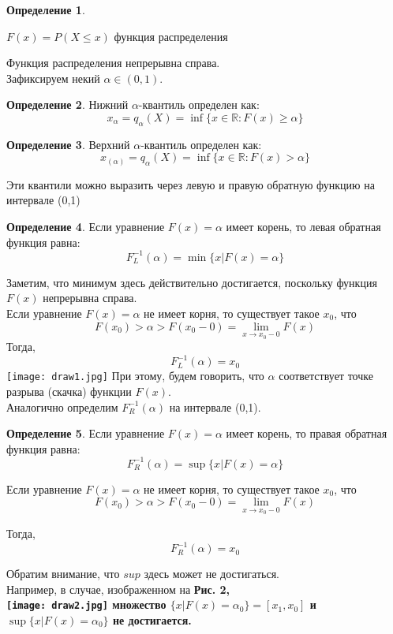 \documentclass[18pt,a4paper]{article}
\theoremstyle{plain}
\theoremstyle{definition}
\newtheorem{Def}{Определение}[section]
\begin{document}
\begin{Def} \label{main}

$F(x) = P(X \le x) $ функция распределения\\
\end{Def}
Функция распределения непрерывна справа.\\
Зафиксируем некий $\alpha \in (0,1)$.
\begin{Def} \label{main}
Нижний $\alpha$-квантиль определен как:
$$
x_{\alpha} = q_\alpha(X) = \inf\{x\in \mathbb{R} :F(x) \ge \alpha\}
$$
\end{Def}
\begin{Def} \label{main}
Верхний $\alpha$-квантиль определен как:
$$
x_{(\alpha)} = q_\alpha(X) = \inf\{x\in \mathbb{R} :F(x) > \alpha\}
$$
\end{Def}

Эти квантили можно выразить через левую и правую обратную функцию на интервале (0,1)\\
\begin{Def} \label{main}
Если уравнение $F(x) = \alpha$ имеет корень, то левая обратная функция равна:\\
$$
F^{-1}_{L}(\alpha) = \min\{x|F(x)=\alpha  \}
$$
\end{Def}
Заметим, что минимум здесь действительно достигается, поскольку функция $F(x)$ непрерывна справа.\\
Если уравнение $F(x) = \alpha$ не имеет корня, то существует такое $x_0$, что
$$
F(x_0) > \alpha > F(x_0-0) = \lim\limits_{x \rightarrow x_0-0}F(x)
$$
Тогда,
$$
F^{-1}_{L}(\alpha) = x_0
$$
\center
\texttt{[image: draw1.jpg]}
\flushleft
При этому, будем говорить, что $\alpha$ соответствует точке разрыва (скачка) функции $F(x)$.\\

Аналогично определим $F^{-1}_{R}(\alpha)$ на интервале (0,1).\\
\begin{Def} \label{main}
Если уравнение $F(x) = \alpha$ имеет корень, то правая обратная функция равна:\\
$$
F^{-1}_{R}(\alpha) = \sup\{x|F(x)=\alpha  \}
$$
\end{Def}

Если уравнение $F(x) = \alpha$ не имеет корня, то существует такое $x_0$, что
$$
F(x_0) > \alpha > F(x_0-0) = \lim\limits_{x \rightarrow x_0-0}F(x)
$$

Тогда,
$$
F^{-1}_{R}(\alpha) = x_0
$$

Обратим внимание, что $sup$ здесь может не достигаться.\\
Например, в случае, изображенном на \bf Рис. 2,\rm\\
\center
\texttt{[image: draw2.jpg]}
\flushleft
множество $\{x|F(x) = \alpha_0 \} = [x_1, x_0]$ и $\sup\{x|F(x) = \alpha_0  \}$ не достигается.\\
\end{document}
